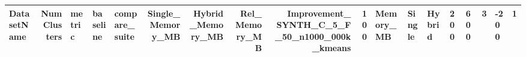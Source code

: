 \begin{tabular}{lrlllrrrrr}
\toprule
DatasetName & NumClusters & metric & baseline & compare_suite & Single_Memory_MB & Hybrid_Memory_MB & Rel_Memory_MB & Improvement_%
\midrule
SYNTH_C_5_F_50_n1000_000k_kmeans & 100 & Memory_MB & Single & Hybrid & 200 & 600 & 3 & -200 & 1 \\
\bottomrule
\end{tabular}
